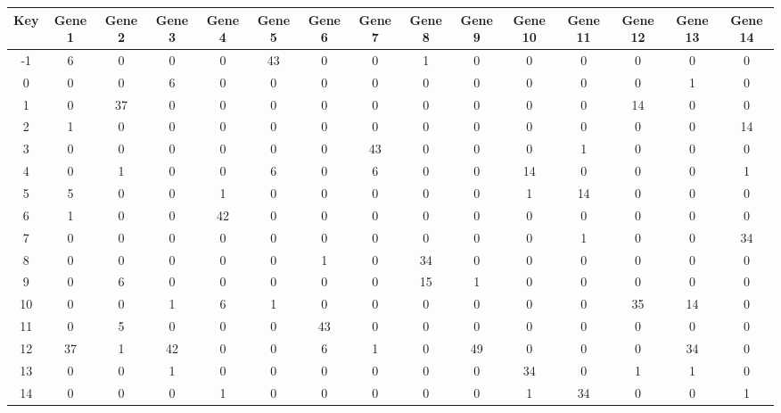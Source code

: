\begin{tabular}{|c|c|c|c|c|c|c|c|c|c|c|c|c|c|c|}
\hline
Key & Gene 1 & Gene 2 & Gene 3 & Gene 4 & Gene 5 & Gene 6 & Gene 7 & Gene 8 & Gene 9 & Gene 10 & Gene 11 & Gene 12 & Gene 13 & Gene 14 \\
\hline
-1 & 6 & 0 & 0 & 0 & 43 & 0 & 0 & 1 & 0 & 0 & 0 & 0 & 0 & 0 \\
0 & 0 & 0 & 6 & 0 & 0 & 0 & 0 & 0 & 0 & 0 & 0 & 0 & 1 & 0 \\
1 & 0 & 37 & 0 & 0 & 0 & 0 & 0 & 0 & 0 & 0 & 0 & 14 & 0 & 0 \\
2 & 1 & 0 & 0 & 0 & 0 & 0 & 0 & 0 & 0 & 0 & 0 & 0 & 0 & 14 \\
3 & 0 & 0 & 0 & 0 & 0 & 0 & 43 & 0 & 0 & 0 & 1 & 0 & 0 & 0 \\
4 & 0 & 1 & 0 & 0 & 6 & 0 & 6 & 0 & 0 & 14 & 0 & 0 & 0 & 1 \\
5 & 5 & 0 & 0 & 1 & 0 & 0 & 0 & 0 & 0 & 1 & 14 & 0 & 0 & 0 \\
6 & 1 & 0 & 0 & 42 & 0 & 0 & 0 & 0 & 0 & 0 & 0 & 0 & 0 & 0 \\
7 & 0 & 0 & 0 & 0 & 0 & 0 & 0 & 0 & 0 & 0 & 1 & 0 & 0 & 34 \\
8 & 0 & 0 & 0 & 0 & 0 & 1 & 0 & 34 & 0 & 0 & 0 & 0 & 0 & 0 \\
9 & 0 & 6 & 0 & 0 & 0 & 0 & 0 & 15 & 1 & 0 & 0 & 0 & 0 & 0 \\
10 & 0 & 0 & 1 & 6 & 1 & 0 & 0 & 0 & 0 & 0 & 0 & 35 & 14 & 0 \\
11 & 0 & 5 & 0 & 0 & 0 & 43 & 0 & 0 & 0 & 0 & 0 & 0 & 0 & 0 \\
12 & 37 & 1 & 42 & 0 & 0 & 6 & 1 & 0 & 49 & 0 & 0 & 0 & 34 & 0 \\
13 & 0 & 0 & 1 & 0 & 0 & 0 & 0 & 0 & 0 & 34 & 0 & 1 & 1 & 0 \\
14 & 0 & 0 & 0 & 1 & 0 & 0 & 0 & 0 & 0 & 1 & 34 & 0 & 0 & 1 \\
\hline
\end{tabular}